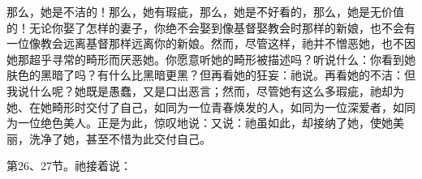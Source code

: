 那么，她是不洁的！那么，她有瑕疵，那么，她是不好看的，那么，她是无价值的！无论你娶了怎样的妻子，你绝不会娶到像基督娶教会时那样的新娘，也不会有一位像教会远离基督那样远离你的新娘。然而，尽管这样，祂并不憎恶她，也不因她那超乎寻常的畸形而厌恶她。你愿意听她的畸形被描述吗？听说什么：你看到她肤色的黑暗了吗？有什么比黑暗更黑？但再看她的狂妄：祂说。再看她的不洁：但我说什么呢？她既是愚蠢，又是口出恶言；然而，尽管她有这么多瑕疵，祂却为她、在她畸形时交付了自己，如同为一位青春焕发的人，如同为一位深爱者，如同为一位绝色美人。正是为此，惊叹地说：又说：祂虽如此，却接纳了她，使她美丽，洗净了她，甚至不惜为此交付自己。\par

第26、27节。祂接着说：\par

